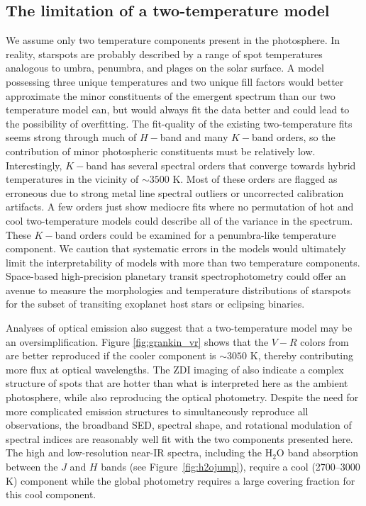 \documentclass[twocolumn]{emulateapj}%
\begin{document}
\subsection{The limitation of a two-temperature model}

We assume only two temperature components present in the photosphere.  In reality, starspots are probably described by a range of spot temperatures analogous to umbra, penumbra, and plages on the solar surface.  A model possessing three unique temperatures and two unique fill factors would better approximate the minor constituents of the emergent spectrum than our two temperature model can, but would always fit the data better and could lead to the possibility of overfitting.  The fit-quality of the existing two-temperature fits seems strong through much of $H-$band and many $K-$band orders, so the contribution of minor photospheric constituents must be relatively low.  Interestingly, $K-$band has several spectral orders that converge towards hybrid temperatures in the vicinity of $\sim3500$ K.  Most of these orders are flagged as erroneous due to strong metal line spectral outliers or uncorrected calibration artifacts.  A few orders just show mediocre fits where no permutation of hot and cool two-temperature models could describe all of the variance in the spectrum.  These $K-$band orders could be examined for a penumbra-like temperature component.  We caution that systematic errors in the models would ultimately limit the interpretability of models with more than two temperature components.  Space-based high-precision planetary transit spectrophotometry could offer an avenue to measure the morphologies and temperature distributions of starspots for the subset of transiting exoplanet host stars or eclipsing binaries.

Analyses of optical emission also suggest that a two-temperature model may be an oversimplification.  Figure \ref{fig:grankin_vr} shows that the $V-R$ colors from \citet{grankin08} are better reproduced if the cooler component is $\sim 3050$ K, thereby contributing more flux at optical wavelengths.  The ZDI imaging of \citet{donati14} also indicate a complex structure of spots that are hotter than what is interpreted here as the ambient photosphere, while also reproducing the optical photometry.  Despite the need for more complicated emission structures to simultaneously reproduce all observations, the broadband SED, spectral shape, and rotational modulation of spectral indices are reasonably well fit with the two components presented here.  The high and low-resolution near-IR spectra, including the H$_2$O band absorption between the $J$ and $H$ bands (see Figure~\ref{fig:h2ojump}), require a cool (2700--3000 K) component while the global photometry requires a large covering fraction for this cool component.  
\end{document}
